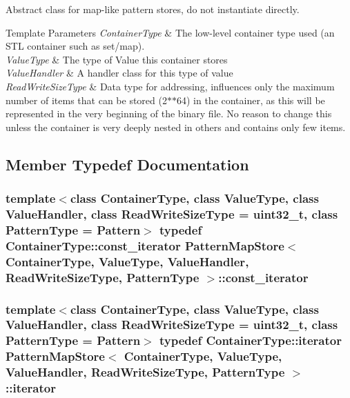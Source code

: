 Abstract class for map-\/like pattern stores, do not instantiate directly. 


\begin{DoxyTemplParams}{Template Parameters}
{\em Container\+Type} & The low-\/level container type used (an S\+T\+L container such as set/map). \\
\hline
{\em Value\+Type} & The type of Value this container stores \\
\hline
{\em Value\+Handler} & A handler class for this type of value \\
\hline
{\em Read\+Write\+Size\+Type} & Data type for addressing, influences only the maximum number of items that can be stored (2$\ast$$\ast$64) in the container, as this will be represented in the very beginning of the binary file. No reason to change this unless the container is very deeply nested in others and contains only few items. \\
\hline
\end{DoxyTemplParams}


\subsection{Member Typedef Documentation}
\hypertarget{classPatternMapStore_a83ae57cc8cb6bf76f5672a0e89684787}{}
\subsubsection[{const\+\_\+iterator}]{\setlength{\rightskip}{0pt plus 5cm}template$<$class Container\+Type, class Value\+Type, class Value\+Handler, class Read\+Write\+Size\+Type = uint32\+\_\+t, class Pattern\+Type = Pattern$>$ typedef Container\+Type\+::const\+\_\+iterator {\bf Pattern\+Map\+Store}$<$ Container\+Type, Value\+Type, Value\+Handler, Read\+Write\+Size\+Type, {\bf Pattern\+Type} $>$\+::{\bf const\+\_\+iterator}}\label{classPatternMapStore_a83ae57cc8cb6bf76f5672a0e89684787}
\hypertarget{classPatternMapStore_a4a2ccac9de68d33712dfb1d6e2c0c3a1}{}
\subsubsection[{iterator}]{\setlength{\rightskip}{0pt plus 5cm}template$<$class Container\+Type, class Value\+Type, class Value\+Handler, class Read\+Write\+Size\+Type = uint32\+\_\+t, class Pattern\+Type = Pattern$>$ typedef Container\+Type\+::iterator {\bf Pattern\+Map\+Store}$<$ Container\+Type, Value\+Type, Value\+Handler, Read\+Write\+Size\+Type, {\bf Pattern\+Type} $>$\+::{\bf iterator}}\label{classPatternMapStore_a4a2ccac9de68d33712dfb1d6e2c0c3a1}


